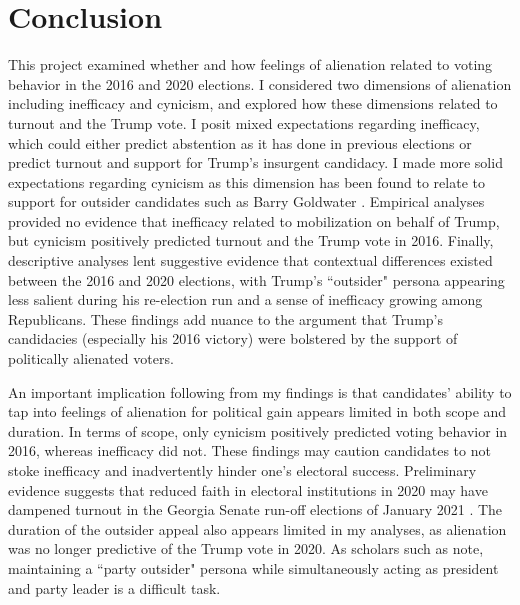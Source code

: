 \documentclass[12pt]{article}
\begin{document}

\section*{Conclusion}\label{sec:conclusion}
This project examined whether and how feelings of alienation related to voting behavior in the 2016 and 2020 elections. I considered two dimensions of alienation including inefficacy and cynicism, and explored how these dimensions related to turnout and the Trump vote. I posit mixed expectations regarding inefficacy, which could either predict abstention as it has done in previous elections or predict turnout and support for Trump's insurgent candidacy. I made more solid expectations regarding cynicism as this dimension has been found to relate to support for outsider candidates such as Barry Goldwater \parencite{aberbach1969alienation}. Empirical analyses provided no evidence that inefficacy related to mobilization on behalf of Trump, but cynicism positively predicted turnout and the Trump vote in 2016. Finally, descriptive analyses lent suggestive evidence that contextual differences existed between the 2016 and 2020 elections, with Trump's ``outsider" persona appearing less salient during his re-election run and a sense of inefficacy growing among Republicans. These findings add nuance to the argument that Trump's candidacies (especially his 2016 victory) were bolstered by the support of politically alienated voters.

An important implication following from my findings is that candidates' ability to tap into feelings of alienation for political gain appears limited in both scope and duration. In terms of scope, only cynicism positively predicted voting behavior in 2016, whereas inefficacy did not. These findings may caution candidates to not stoke inefficacy and inadvertently hinder one's electoral success. Preliminary evidence suggests that reduced faith in electoral institutions in 2020 may have dampened turnout in the Georgia Senate run-off elections of January 2021 \parencite{green2020online}. The duration of the outsider appeal also appears limited in my analyses, as alienation was no longer predictive of the Trump vote in 2020. As scholars such as \textcite{jungherr2019digital} note, maintaining a ``party outsider" persona while simultaneously acting as president and party leader is a difficult task. 
\end{document}
